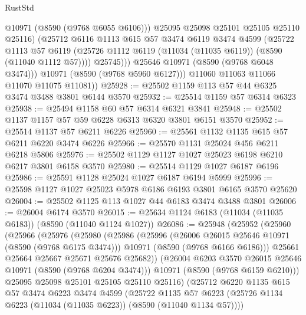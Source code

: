 \begin{lexlean}{RustStd}
\begin{coremodule}
                    @10971
                    (@8590 (@9768 @6055 @6106)))
                  @25095
                  @25098
                  @25101
                  @25105
                  @25110
                  @25116)
                (@25712
                  @6116
                  @1113
                  @615
                  @57
                  @3474
                  @6119
                  @3474
                  @4599
                  (@25722
                    @1113
                    @57
                    @6119
                    (@25726 @1112 @6119 (@11034 (@11035 @6119)) (@8590 (@11040 @1112 @57))))
                  @25745)))
            @25646
            @10971
            (@8590 (@9768 @6048 @3474)))
          @10971
          (@8590 (@9768 @5960 @6127)))
        @11060
        @11063
        @11066
        @11070
        @11075
        @11081))
@25928 := @25502 @1159 @113 @57 @44 @6325 @3474 @3488 @3801 @6144 @3570
@25932 := @25514 @1159 @57 @6314 @6323
@25938 := @25494 @1158 @60 @57 @6314 @6321 @3841
@25948 := @25502 @1137 @1157 @57 @59 @6228 @6313 @6320 @3801 @6151 @3570
@25952 := @25514 @1137 @57 @6211 @6226
@25960 := @25561 @1132 @1135 @615 @57 @6211 @6220 @3474 @6226
@25966 := @25570 @1131 @25024 @456 @6211 @6218 @5806
@25976 := @25502 @1129 @1127 @1027 @25023 @6198 @6210 @6217 @3801 @6158 @3570
@25980 := @25514 @1129 @1027 @6187 @6196
@25986 := @25591 @1128 @25024 @1027 @6187 @6194 @5999
@25996 := @25598 @1127 @1027 @25023 @5978 @6186 @6193 @3801 @6165 @3570 @25620
@26004 := @25502 @1125 @113 @1027 @44 @6183 @3474 @3488 @3801
@26006 := @26004 @6174 @3570
@26015 := @25634 @1124 @6183 (@11034 (@11035 @6183)) (@8590 (@11040 @1124 @1027))
@26086 := @25948
    (@25952
      (@25960
        (@25966
          (@25976
            (@25980
              (@25986
                (@25996
                  (@26006 @26015 @25646 @10971 (@8590 (@9768 @6175 @3474)))
                  @10971
                  (@8590 (@9768 @6166 @6186)))
                @25661
                @25664
                @25667
                @25671
                @25676
                @25682))
            (@26004 @6203 @3570 @26015 @25646 @10971 (@8590 (@9768 @6204 @3474)))
            @10971
            (@8590 (@9768 @6159 @6210)))
          @25095
          @25098
          @25101
          @25105
          @25110
          @25116)
        (@25712
          @6220
          @1135
          @615
          @57
          @3474
          @6223
          @3474
          @4599
          (@25722
            @1135
            @57
            @6223
            (@25726 @1134 @6223 (@11034 (@11035 @6223)) (@8590 (@11040 @1134 @57))))

\end{coremodule}
\end{lexlean}
